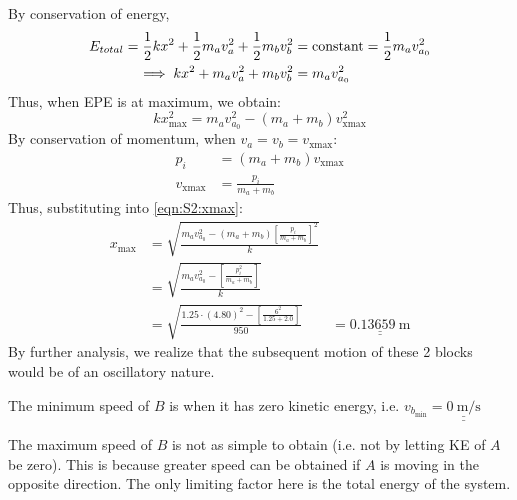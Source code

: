 \documentclass[answers]{exam}
\def\doubleunderline#1{\underline{\underline{#1}}}
\begin{document}
\begin{questions}
{\begin{solutionorbox}[170mm]
			By conservation of energy, 
			\begin{align}
				E_{total} = \frac{1}{2}kx^2 + \frac{1}{2}m_av_a^2 + \frac{1}{2}m_bv_b^2 &= \text{constant} = \frac{1}{2} m_av_{a_0}^2 \notag \\
				\implies kx^2 + m_av_a^2 + m_bv_b^2 &= m_av_{a_0}^2 \label{eqn:S2:coe}
			\end{align}
			Thus, when EPE is at maximum, we obtain:
			\begin{equation}
				kx_{\text{max}}^2 = m_av_{a_0}^2 - \left(m_a + m_b\right)v_{\text{xmax}}^2 \label{eqn:S2:xmax}
			\end{equation}
			By conservation of momentum, when $v_a = v_b = v_{\text{xmax}}$:
			\begin{align*}
				p_i &= \left(m_a + m_b\right)v_{\text{xmax}} \\
				v_{\text{xmax}} &= \frac{p_i}{m_a + m_b}
			\end{align*}
			Thus, substituting into \eqref{eqn:S2:xmax}:
			\begin{align*}
				x_\text{max} &= \sqrt{\frac{m_av_{a_0}^2 - \left(m_a + m_b\right)\left[\frac{p_i}{m_a + m_b}\right]^2}{k}} \\
				&= \sqrt{\frac{m_av_{a_0}^2 - \left[\frac{p_i^2}{m_a + m_b}\right]}{k}}\\
				&= \sqrt{\frac{1.25 \cdot (4.80)^2 - \left[\frac{6^2}{1.25 + 2.0}\right]}{950}}
				&= \doubleunderline{\SI{0.13659}{\meter}}
			\end{align*}
			By further analysis, we realize that the subsequent motion of these 2 blocks would be of an oscillatory nature. 
			
			The minimum speed of $B$ is when it has zero kinetic energy, i.e. $v_{b_\text{min}} = \doubleunderline{\SI{0}{\meter\per\second}}$
			
			The maximum speed of $B$ is not as simple to obtain (i.e. not by letting KE of $A$ be zero). This is because greater speed can be obtained if $A$ is moving in the opposite direction. The only limiting factor here is the total energy of the system.
			

\end{solutionorbox}}
\end{questions}
\end{document}

